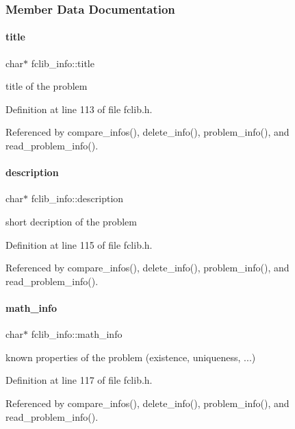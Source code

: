 \subsubsection{Member Data Documentation}
\mbox{\label{structfclib__info_a4ea1b298e3aa7228a5f2a55f711f41d2}} 
\paragraph{\texorpdfstring{title}{title}}
{\footnotesize\ttfamily char$\ast$ fclib\+\_\+info\+::title}



title of the problem 



Definition at line 113 of file fclib.\+h.



Referenced by compare\+\_\+infos(), delete\+\_\+info(), problem\+\_\+info(), and read\+\_\+problem\+\_\+info().

\mbox{\label{structfclib__info_a0c1680fee67eaf7b20c436a775d4f35d}} 
\paragraph{\texorpdfstring{description}{description}}
{\footnotesize\ttfamily char$\ast$ fclib\+\_\+info\+::description}



short decription of the problem 



Definition at line 115 of file fclib.\+h.



Referenced by compare\+\_\+infos(), delete\+\_\+info(), problem\+\_\+info(), and read\+\_\+problem\+\_\+info().

\mbox{\label{structfclib__info_ad6dadb3af34a719e5ec3cab2d499c7f2}} 
\paragraph{\texorpdfstring{math\+\_\+info}{math\_info}}
{\footnotesize\ttfamily char$\ast$ fclib\+\_\+info\+::math\+\_\+info}



known properties of the problem (existence, uniqueness, ...) 



Definition at line 117 of file fclib.\+h.



Referenced by compare\+\_\+infos(), delete\+\_\+info(), problem\+\_\+info(), and read\+\_\+problem\+\_\+info().

